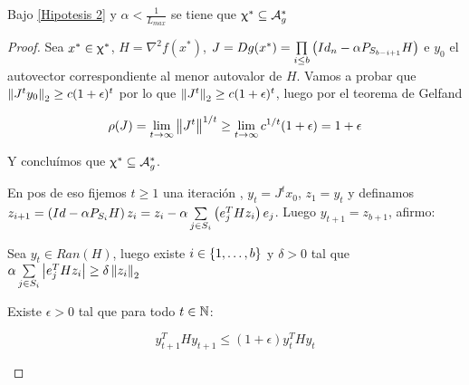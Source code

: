 \begin{proposition}
	\label{prop: DC los puntos silla estrictos son fijos inestables}
	Bajo \ref{Hipotesis 2} y $\alpha < \frac{1}{L_{max}}$ se tiene que $\upchi^* \subseteq \mathcal{A}_{g}^{*}$
\end{proposition}

\begin{proof}
	Sea $x^* \in \upchi^*$, $H = \nabla^2 f(x^*)$, 
	$J=Dg(x^*) = \prod\limits_{i \leq b}{\left(Id_n - \alpha P_{S_{b-i+1}}H\right)}$ e $y_0$ el autovector correspondiente al menor autovalor de $H$. Vamos a probar que $\left\lVert J^t y_0\right\rVert_2 \geq c(1+\epsilon)^t$ por lo que $\left\lVert J^t\right\rVert _2 \geq  c(1+\epsilon)^t$, luego por el teorema de Gelfand
	
	
	\begin{equation*}
	\rho(J) = \lim\limits_{t \rightarrow \infty}{\left\lVert J^t\right\rVert^{1/t}} \geq \lim\limits_{t \rightarrow \infty}{c^{1/t} (1+\epsilon)} = 1 + \epsilon 
	\end{equation*}
	
	Y conclu\'imos que $\upchi^* \subseteq \mathcal{A}_{g}^{*}$.
	
	En pos de eso fijemos $t \geq 1$ una iteraci\'on , $y_t = J^t x_0$, $z_1 = y_t$ y definamos $z_{i+1} = \left(Id - \alpha P_{S_i}H\right)z_i = z_i - \alpha \sum\limits_{j \in S_i}{\left(e_j^T H z_i\right)e_j}$. Luego $y_{t+1} = z_{b+1}$, afirmo:
	
	
	\begin{claim}
		\label{claim1: DC los puntos silla estrictos son fijos inestables}
		Sea $y_t \in Ran(H)$, luego existe $i \in \left\lbrace1, \dots, b\right\rbrace$ y $\delta > 0$ tal que $\alpha \sum\limits_{j \in S_i}{\left\lvert e_j^T H z_i\right\rvert} \geq \delta \left\lVert z_i\right\rVert_2$
	\end{claim}
	
	\begin{lemma}
		\label{lemma1 : DC los puntos silla estrictos son fijos inestables}
		Existe $\epsilon >0$ tal que para todo $t \in {\mathbb{N}}$:
		
		\begin{equation*}
		\label{eq_1: DC los puntos silla estrictos son fijos inestables}
		y_{t+1}^THy_{t+1} \leq (1+\epsilon) y_{t}^THy_{t} 
		\end{equation*}
		
	\end{lemma}
	

\end{proof}
